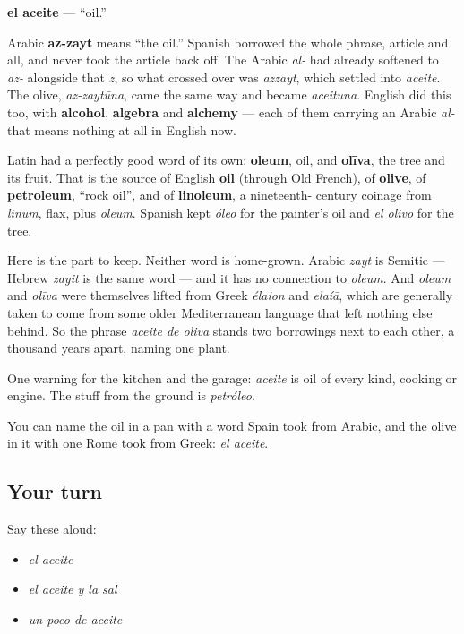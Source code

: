 \begin{cousinweb}
\textbf{el aceite} — \textquotedblleft{}oil.\textquotedblright{}

Arabic \textbf{az-zayt} means \textquotedblleft{}the oil.\textquotedblright{} Spanish borrowed the whole phrase, article and all, and never took the article back off. The Arabic \emph{al-} had already softened to \emph{az-} alongside that \emph{z}, so what crossed over was \emph{azzayt}, which settled into \emph{aceite}. The olive, \emph{az-zaytūna}, came the same way and became \emph{aceituna}. English did this too, with \textbf{alcohol}, \textbf{algebra} and \textbf{alchemy} — each of them carrying an Arabic \emph{al-} that means nothing at all in English now.

Latin had a perfectly good word of its own: \textbf{oleum}, oil, and \textbf{olīva}, the tree and its fruit. That is the source of English \textbf{oil} (through Old French), of \textbf{olive}, of \textbf{petroleum}, \textquotedblleft{}rock oil\textquotedblright{}, and of \textbf{linoleum}, a nineteenth- century coinage from \emph{linum}, flax, plus \emph{oleum}. Spanish kept \emph{óleo} for the painter's oil and \emph{el olivo} for the tree.

Here is the part to keep. Neither word is home-grown. Arabic \emph{zayt} is Semitic — Hebrew \emph{zayit} is the same word — and it has no connection to \emph{oleum}. And \emph{oleum} and \emph{olīva} were themselves lifted from Greek \emph{élaion} and \emph{elaíā}, which are generally taken to come from some older Mediterranean language that left nothing else behind. So the phrase \emph{aceite de oliva} stands two borrowings next to each other, a thousand years apart, naming one plant.

One warning for the kitchen and the garage: \emph{aceite} is oil of every kind, cooking or engine. The stuff from the ground is \emph{petróleo}.
\end{cousinweb}

\begin{grammarlens}[title={What you've built}]
You can name the oil in a pan with a word Spain took from Arabic, and the olive in it with one Rome took from Greek: \emph{el aceite}.
\end{grammarlens}

\subsection*{Your turn}
Say these aloud:

\begin{itemize}
\raggedright
  \item \emph{el aceite}
  \item \emph{el aceite y la sal}
  \item \emph{un poco de aceite}
\end{itemize}

